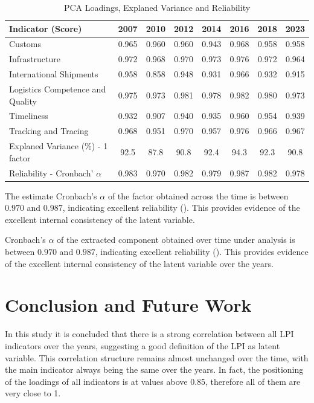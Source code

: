 \documentclass[conference]{IEEEtran}
\begin{document}
\begin{table}[h]
  \caption{PCA Loadings, Explaned Variance and Reliability}
  \label{tab:loadings}
\begin{tabular}{lccccccc}
\toprule
\textbf{Indicator (Score)}	&	\textbf{2007}	&	\textbf{2010}	&	\textbf{2012}	&	\textbf{2014}	&	\textbf{2016}	&	\textbf{2018}	&	\textbf{2023}	\\  
\midrule
Customs	&	0.965	&	0.960	&	0.960	&	0.943	&	0.968	&	0.958	&	0.958	\\	
Infrastructure	&	0.972	&	0.968	&	0.970	&	0.973	&	0.976	&	0.972	&	0.964	\\	
International Shipments	&	0.958	&	0.858	&	0.948	&	0.931	&	0.966	&	0.932	&	0.915	\\	
Logistics Competence and Quality	&	0.975	&	0.973	&	0.981	&	0.978	&	0.982	&	0.980	&	0.973	\\	
Timeliness	&	0.932	&	0.907	&	0.940	&	0.935	&	0.960	&	0.954	&	0.939	\\	
Tracking and Tracing	&	0.968	&	0.951	&	0.970	&	0.957	&	0.976	&	0.966	&	0.967	\\	\midrule
Explaned Variance (\%) - 1 factor 	&	92.5	&	87.8	&	90.8	&	92.4	&	94.3	&	92.3	&	90.8	\\	\midrule
Reliability - Cronbach' $\alpha$	&	0.983	&	0.970	&	0.982	&	0.979	&	0.987	&	0.982	&	0.978	\\	\bottomrule
\end{tabular}
\end{table}

The estimate Cronbach's $\alpha$ of the factor obtained across the time is between $0.970$ and $0.987$, indicating excellent reliability (\cite{pestana2008analise}). This provides evidence of the excellent internal consistency of the latent variable.

Cronbach's $\alpha$ of the extracted component obtained over time under analysis is between $0.970$ and $0.987$, indicating excellent reliability (\cite{pestana2008analise}). This provides evidence of the excellent internal consistency of the latent variable over the years.

\section{Conclusion and Future Work}

In this study it is concluded that there is a strong correlation between all LPI indicators over the years, suggesting a good definition of the LPI as latent variable. This correlation structure remains almost unchanged over the time, with the main indicator always being the same over the years. In fact, the positioning of the loadings of all indicators is at values above 0.85, therefore all of them are very close to 1.
\end{document}
